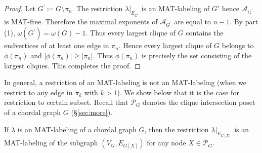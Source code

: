 \begin{proof}
Let $ G^{\prime} \coloneqq G\setminus \pi_{n} $. 
The restriction $ \lambda|_{E_{G^{\prime}}} $ is an MAT-labeling of $G'$ hence $ \mathcal{A}_{G^{\prime}} $ is MAT-free. 
Therefore the maximal exponents of $ \mathcal{A}_{G^{\prime}} $ are equal to $ n-1 $.
By part (1), $ \omega(G^{\prime}) = \omega(G)-1 $. 
Thus every largest clique of $ G $ contains the endvertices of at least one edge in $ \pi_{n} $. 
Hence every largest clique of $ G $ belongs to $ \phi(\pi_{n}) $ and $ |\phi(\pi_{n})| \geq  |\pi_{n}|  $. 
Thus $ \phi(\pi_{n}) $ is precisely the set consisting of the largest cliques. 
This completes the proof. 
\end{proof}

In general, a restriction of an MAT-labeling is not an MAT-labeling (\eg  when we restrict to any edge in $\pi_k$ with $k>1$). 
We show below that it is the case for restriction to certain subset. 
Recall that  $ \mathcal{P}_{G} $ denotes the clique intersection poset of a chordal graph $ G $ (\S \ref{sec:more}). 
\begin{lemma}\label{restriction to intersection of maximal cliques}
If $ \lambda $ is an MAT-labeling of a chordal graph $ G $, then the restriction $ \lambda|_{E_{G[X]}} $ is an MAT-labeling of the subgraph $ (V_{G}, E_{G[X]}) $ for any node $ X \in \mathcal{P}_{G} $. 
\end{lemma}
